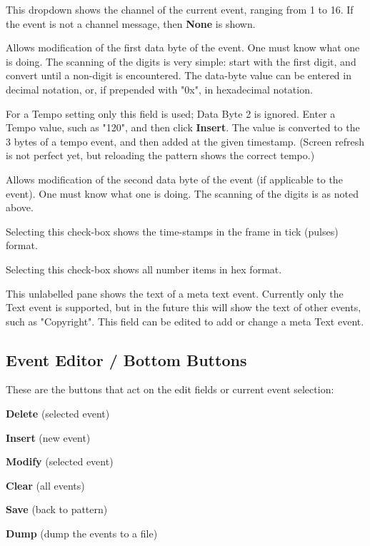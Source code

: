    This dropdown shows the channel of the current event, ranging from 1 to 16.
   If the event is not a channel message, then \textbf{None} is shown.

   Allows modification of the first data byte of the event.
   One must know what one is doing.
   The scanning of the digits is very simple:  start with the first digit, and
   convert until a non-digit is encountered.  The data-byte value can be
   entered in decimal notation, or, if prepended with "0x", in hexadecimal
   notation.

   For a Tempo setting only this field is used; Data Byte 2 is ignored.
   Enter a Tempo value, such as "120", and then click \textbf{Insert}. The
   value is converted to the 3 bytes of a tempo event, and then
   added at the given timestamp.  (Screen refresh is not perfect yet, but
   reloading the pattern shows the correct tempo.)

   Allows modification of the second data byte of the event (if applicable
   to the event).
   One must know what one is doing.
   The scanning of the digits is as noted above.

   Selecting this check-box
   shows the time-stamps in the frame in tick (pulses) format.

   Selecting this check-box
   shows all number items in hex format.

   This unlabelled pane shows the text of a meta text event.  Currently
   only the Text event is supported, but in the future this will show the
   text of other events, such as "Copyright".
   This field can be edited to add or change a meta Text event.


\subsection{Event Editor / Bottom Buttons}
\label{subsec:event_editor_buttons}

   These are the buttons that act on the edit fields or current event
   selection:

   \begin{enumber}
      \item \textbf{Delete} (selected event)
      \item \textbf{Insert} (new event)
      \item \textbf{Modify} (selected event)
      \item \textbf{Clear} (all events)
      \item \textbf{Save} (back to pattern)
      \item \textbf{Dump} (dump the events to a file)
   \end{enumber}

